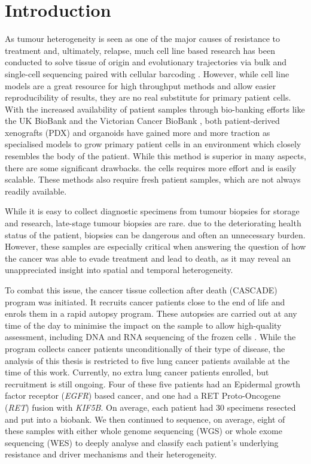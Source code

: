 \section{Introduction}
\label{cascade-sec:intro}

As tumour heterogeneity is seen as one of the major causes of resistance to treatment and, ultimately, relapse, much cell line based research has been conducted to solve tissue of origin and evolutionary trajectories via bulk and single-cell sequencing paired with cellular barcoding \cite{Fennell2021,Penter2022}. However, while cell line models are a great resource for high throughput methods and allow easier reproducibility of results, they are no real substitute for primary patient cells. With the increased availability of patient samples through bio-banking efforts like the UK BioBank \cite{Sudlow2015} and the Victorian Cancer BioBank \cite{CCV2006}, both patient-derived xenografts (PDX) and organoids have gained more and more traction \cite{Yoshida2020} as specialised models to grow primary patient cells in an environment which closely resembles the body of the patient. While this method is superior in many aspects, there are some significant drawbacks.  the cells requires more effort and is  easily scalable. These methods also require fresh patient samples, which are not always readily available.


While it is  easy to collect diagnostic specimens from tumour biopsies for storage and research, late-stage tumour biopsies are rare.  due to the deteriorating health status of the patient, biopsies can be dangerous and often an unnecessary burden. However, these samples are especially critical when answering the question of how the cancer was able to evade treatment and lead to death, as it may reveal an unappreciated insight into spatial and temporal heterogeneity.

To combat this issue, the cancer tissue collection after death (CASCADE) program was initiated. It recruits cancer patients close to the end of life and enrols them in a rapid autopsy program. These autopsies are carried out at any time of the day to minimise the impact on the sample to allow high-quality assessment, including DNA and RNA sequencing of the frozen cells \cite{Alsop2016}.
While the program collects cancer patients unconditionally of their type of disease, the analysis of this thesis is restricted to five lung cancer patients available at the time of this work. Currently, no extra lung cancer patients  enrolled, but recruitment is still ongoing. Four of these five patients had an Epidermal growth factor receptor (\textit{EGFR}) based cancer, and one had a RET Proto-Oncogene (\textit{RET}) fusion with \textit{KIF5B}. On average, each patient had 30 specimens resected and put into a biobank. We then continued to sequence, on average, eight of these samples with either whole genome sequencing (WGS) or whole exome sequencing (WES) to deeply analyse and classify each patient's underlying resistance and driver mechanisms and their heterogeneity.

